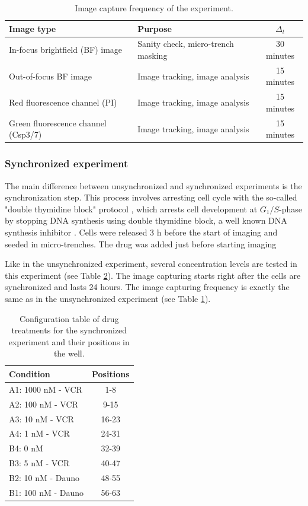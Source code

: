 \documentclass[pdftex,12pt,a4paper]{report}
\begin{document}
\begin{table}[H]
\centering
\begin{tabular}{ l | l | c }
\hline
Image type & Purpose & $\Delta_t$ \\
\hline\hline
In-focus brightfield (BF) image & Sanity check, micro-trench masking & 30 minutes \\
Out-of-focus BF image & Image tracking, image analysis & 15 minutes \\
Red fluorescence channel (PI)& Image tracking, image analysis & 15 minutes \\
Green fluorescence channel (Csp3/7) & Image tracking, image analysis & 15 minutes \\
\hline
\end{tabular}
\caption{Image capture frequency of the experiment.}
\label{table:image_capture_frequency}
\end{table}


\subsubsection{Synchronized experiment}
\label{subsection:synchronized_experiment}

The main difference between unsynchronized and synchronized experiments is the synchronization step. This process involves arresting cell cycle with the so-called "double thymidine block" protocol \cite{harper2005synchronization}, which arrests cell development at $G_1/S$-phase by stopping DNA synthesis using double thymidine block, a well known DNA synthesis inhibitor \cite{bostock1971evaluation}. Cells were released 3 h before the start of imaging and seeded in micro-trenches. The drug was added just before starting imaging

Like in the unsynchronized experiment, several concentration levels are tested in this experiment (see Table \ref{table:syn_treatments}). The image capturing starts right after the cells are synchronized and lasts 24 hours. The image capturing frequency is exactly the same as in the unsynchronized experiment (see Table \ref{table:image_capture_frequency}).

\begin{table}[H]
\centering
\begin{tabular}{ l | c }
\hline
Condition & Positions \\
\hline\hline
A1: 1000 nM - VCR & 1-8 \\
A2: 100 nM - VCR & 9-15 \\
A3: 10 nM - VCR & 16-23 \\
A4: 1 nM - VCR & 24-31 \\
B4: 0 nM & 32-39 \\
B3: 5 nM - VCR & 40-47 \\
B2: 10 nM - Dauno & 48-55 \\
B1: 100 nM - Dauno & 56-63 \\
\hline
\end{tabular}
\caption{Configuration table of drug treatments for the synchronized experiment and their positions in the well.}
\label{table:syn_treatments}
\end{table}
\end{document}
